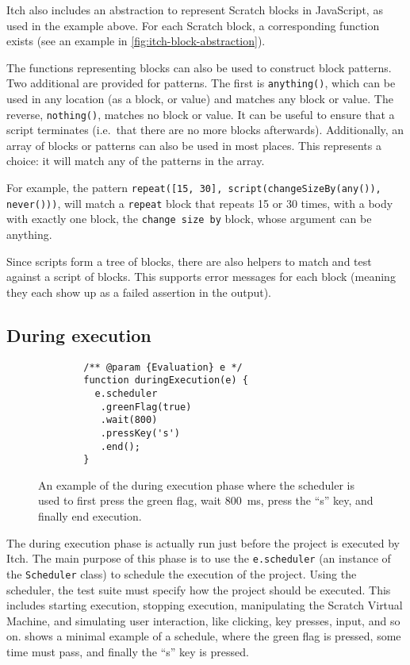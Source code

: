 \documentclass[../main]{subfiles}
\begin{document}
Itch also includes an abstraction to represent Scratch blocks in JavaScript, as used in the example above.
For each Scratch block, a corresponding function exists (see an example in \cref{fig:itch-block-abstraction}).

The functions representing blocks can also be used to construct block patterns.
Two additional are provided for patterns.
The first is \texttt{anything()}, which can be used in any location (as a block, or value) and matches any block or value.
The reverse, \texttt{nothing()}, matches no block or value.
It can be useful to ensure that a script terminates (i.e.\ that there are no more blocks afterwards).
Additionally, an array of blocks or patterns can also be used in most places.
This represents a choice: it will match any of the patterns in the array.

For example, the pattern \texttt{repeat([15, 30], script(changeSizeBy(any()), never()))}, will match a \texttt{repeat} block that repeats 15 or 30 times, with a body with exactly one block, the \texttt{change size by} block, whose argument can be anything.

Since scripts form a tree of blocks, there are also helpers to match and test against a script of blocks.
This supports error messages for each block (meaning they each show up as a failed assertion in the output).

\subsection{During execution}\label{subsec:during-execution}

\begin{figure}
    \begin{verbatim}
        /** @param {Evaluation} e */
        function duringExecution(e) {
          e.scheduler
           .greenFlag(true)
           .wait(800)
           .pressKey('s')
           .end();
        }
    \end{verbatim}
    \caption{An example of the during execution phase where the scheduler is used to first press the green flag, wait \qty{800}{\milli\second}, press the ``s'' key, and finally end execution.}\label{fig:itch-scheduler-example}
\end{figure}

The during execution phase is actually run just before the project is executed by Itch.
The main purpose of this phase is to use the \texttt{e.scheduler} (an instance of the \texttt{Scheduler} class) to schedule the execution of the project.
Using the scheduler, the test suite must specify how the project should be executed.
This includes starting execution, stopping execution, manipulating the Scratch Virtual Machine, and simulating user interaction, like clicking, key presses, input, and so on.
 shows a minimal example of a schedule, where the green flag is pressed, some time must pass, and finally the ``s'' key is pressed.
\end{document}
